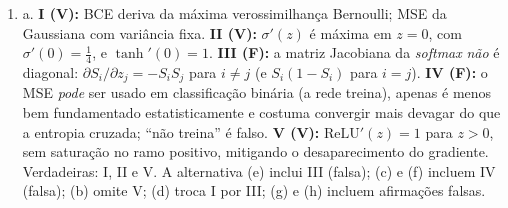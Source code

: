 \documentclass{dlproblemset}
\begin{document}
\begin{enumerate}[1)]
    \item a. \textbf{I (V):} BCE deriva da máxima verossimilhança Bernoulli; MSE da Gaussiana com variância fixa. \textbf{II (V):} $\sigma'(z)$ é máxima em $z = 0$, com $\sigma'(0) = \tfrac{1}{4}$, e $\tanh'(0) = 1$. \textbf{III (F):} a matriz Jacobiana da \textit{softmax} \emph{não} é diagonal: $\partial S_i/\partial z_j = -S_i S_j$ para $i \neq j$ (e $S_i(1-S_i)$ para $i = j$). \textbf{IV (F):} o MSE \emph{pode} ser usado em classificação binária (a rede treina), apenas é menos bem fundamentado estatisticamente e costuma convergir mais devagar do que a entropia cruzada; ``não treina'' é falso. \textbf{V (V):} $\mathrm{ReLU}'(z) = 1$ para $z > 0$, sem saturação no ramo positivo, mitigando o desaparecimento do gradiente. Verdadeiras: I, II e V. A alternativa (e) inclui III (falsa); (c) e (f) incluem IV (falsa); (b) omite V; (d) troca I por III; (g) e (h) incluem afirmações falsas.


\end{enumerate}
\end{document}
